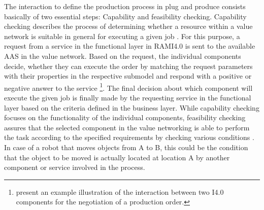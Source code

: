 The interaction to define the production process in plug and produce consists basically of two essential steps: Capability and feasibility checking. Capability checking describes the process of determining whether a resource within a value network is suitable in general for executing a given job \cite[p. 6]{Bayha2020DescribingComponents}. For this purpose, a request from a service in the functional layer in \ac{RAMI4.0} is sent to the available \ac{AAS} in the value network. Based on the request, the individual components decide, whether they can execute the order by matching the request parameters with their properties in the respective submodel and respond with a positive or negative answer to the service \cite[p. 20]{Bock2016Weiterentwicklung4.0-Komponenten} \footnote{\citet[p. 22]{Bock2016Weiterentwicklung4.0-Komponenten} present an example illustration of the interaction between two \ac{I4.0} components for the negotiation of a production order.}. The final decision about which component will execute the given job is finally made by the requesting service in the functional layer based on the criteria defined in the business layer. While capability checking focuses on the functionality of the individual components, feasibility checking assures that the selected component in the value networking is able to perform the task according to the specified requirements by checking various conditions \cite[p. 6]{Bayha2020DescribingComponents} \cite[p. 15]{Bock2016Weiterentwicklung4.0-Komponenten}. In case of a robot that moves objects from A to B, this could be the condition that the object to be moved is actually located at location A by another component or service involved in the process.

